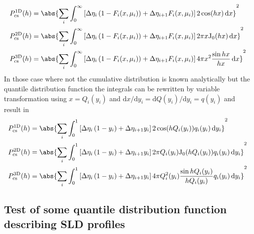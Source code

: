 \begin{align}
  P_\textrm{cs}^\mathrm{1D}(h) & = \abs{\sum_i  \int_0^\infty \left[\Delta\eta_i\left(1-F_i(x,\mu_i)\right) +\Delta\eta_{i+1} F_i(x,\mu_i)\right] 2\cos (hx)\,\mathrm{d}x }^2 \\
  P_\textrm{cs}^\mathrm{2D}(h) & = \abs{\sum_i  \int_0^\infty \left[\Delta\eta_i\left(1-F_i(x,\mu_i)\right) +\Delta\eta_{i+1} F_i(x,\mu_i)\right] 2\pi x \textrm{J}_0(hx)\,\mathrm{d}x }^2 \\
  P_\textrm{cs}^\mathrm{3D}(h) & = \abs{\sum_i  \int_0^\infty \left[\Delta\eta_i\left(1-F_i(x,\mu_i)\right) +\Delta\eta_{i+1} F_i(x,\mu_i)\right] 4\pi x^2\frac{\sin hx}{hx}\,\mathrm{d}x }^2
\end{align}
In those case where not the cumulative distribution is known analytically but the quantile distribution function the integrals can be rewritten by variable transformation using $x=Q_i(y_i)$ and $\mathrm{d}x/\mathrm{d}y_i=\mathrm{d}Q(y_i)/\mathrm{d}y_i=q(y_i)$ and result in
\begin{align}
  P_\textrm{cs}^\mathrm{1D}(h) & = \abs{\sum_i  \int_0^1 \left[\Delta\eta_i\left(1-y_i\right) +\Delta\eta_{i+1} y_i\right] 2\cos (hQ_i(y_i))q_i(y_i)\,\mathrm{d}y_i }^2 \\
  P_\textrm{cs}^\mathrm{2D}(h) & = \abs{\sum_i  \int_0^1 \left[\Delta\eta_i\left(1-y_i\right) +\Delta\eta_{i+1} y_i\right] 2\pi Q_i(y_i) \textrm{J}_0(hQ_i(y_i))q_i(y_i)\,\mathrm{d}y_i }^2 \\
  P_\textrm{cs}^\mathrm{3D}(h) & = \abs{\sum_i  \int_0^1 \left[\Delta\eta_i\left(1-y_i\right) +\Delta\eta_{i+1} y_i\right] 4\pi Q_i^2(y_i)\frac{\sin hQ_i(y_i)}{hQ_i(y_i)}q_i(y_i)\,\mathrm{d}y_i }^2
\end{align}


\subsection{Test of some quantile distribution function describing SLD profiles} 